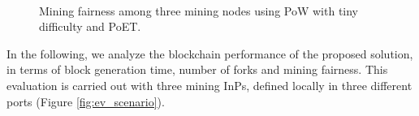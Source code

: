 \begin{figure}[bth]
	\myfloatalign
	 \quad
	 \\
	\caption{Mining fairness among three mining nodes using PoW with tiny difficulty and PoET.}
	\label{fig:fairness}
\end{figure}

In the following, we analyze the blockchain performance of the proposed solution, in terms of block generation time, number of forks and mining fairness. This evaluation is carried out with three mining InPs, defined locally in three different ports (Figure \ref{fig:ev_scenario}).

